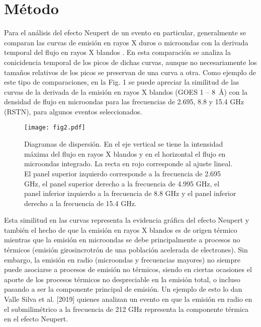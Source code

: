 \documentclass[baaa]{baaa}
\begin{document}
\section{M\'etodo}
Para el an\'alisis del efecto Neupert de un evento en particular, generalmente se comparan las curvas de emisi\'on 
en rayos X duros o microondas con la derivada temporal del flujo en rayos X blandos 
\citep{DennisandZarro:1993,McTiernanetal:1999,Veronig:2003b,NingandCao:2010}. En esta comparaci\'on se analiza la 
conicidencia temporal de los picos de dichas curvas, aunque no necesariamente los tama\~nos relativos de los picos 
se preservan de una curva a otra. Como ejemplo de este tipo de comparaciones, en la Fig. 1 se puede 
apreciar la similitud de las curvas de la derivada de la emisi\'on en rayos X blandos (GOES 1 -- 8~\AA) con la 
densidad de flujo en microondas para las frecuencias de 2.695, 8.8 y 15.4 GHz (RSTN), para algunos eventos seleccionados.


\begin{figure*}[h]
\centering
\texttt{[image: fig2.pdf]}
\caption{Diagramas de dispersi\'on. En el eje vertical se tiene la intensidad m\'axima del flujo en rayos X blandos 
y en el horizontal el flujo en microondas integrado. La recta en rojo corresponde al ajuste lineal. El panel superior izquierdo 
corresponde a la frecuencia de 2.695 GHz, el panel superior derecho a la frecuencia de 4.995 GHz, el panel inferior 
izquierdo a la frecuencia de 8.8 GHz y el panel inferior derecho a la frecuencia de 15.4 GHz.}
\label{Figura2}
\end{figure*}
Esta similitud en las curvas representa la evidencia gr\'afica del efecto Neupert y tambi\'en el hecho 
de que la emisi\'on en rayos X blandos es de origen t\'ermico mientras que la emisi\'on en microondas se debe 
principalmente a procesos no t\'ermicos (emisi\'on girosincrotr\'on  de una poblaci\'on acelerada de electrones). 
 Sin embargo, la emisi\'on en radio (microondas y frecuencias mayores) no siempre puede asociarse a procesos de 
emisi\'on no t\'ermicos, siendo en ciertas ocasiones el aporte de los procesos t\'ermicos no despreciable en la 
emisi\'on total, o incluso pasando a ser la componente principal de emisi\'on. Un ejemplo de esto lo dan 
Valle Silva et al. [2019]\nocite{ValleSilvaetal:2019} quienes analizan un evento en que la emisi\'on en 
radio en el submilim\'etrico a la frecuencia de 212 GHz representa la componente t\'ermica en el efecto 
Neupert.
\end{document}
